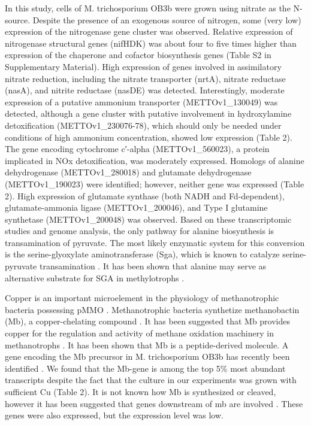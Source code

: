 In this study, cells of M. trichosporium OB3b were grown using nitrate as the N-source.
Despite the presence of an exogenous source of nitrogen, some (very low) expression of the nitrogenase gene cluster was observed.
Relative expression of nitrogenase structural genes (nifHDK) was about four to five times higher than expression of the chaperone and cofactor biosynthesis genes (Table S2 in Supplementary Material).
High expression of genes involved in assimilatory nitrate reduction, including the nitrate transporter (nrtA), nitrate reductase (nasA), and nitrite reductase (nasDE) was detected.
Interestingly, moderate expression of a putative ammonium transporter (METTOv1\_130049) was detected, although a gene cluster with putative involvement in hydroxylamine detoxification (METTOv1\_230076-78), which should only be needed under conditions of high ammonium concentration, showed low expression (Table 2).
The gene encoding cytochrome c′-alpha (METTOv1\_560023), a protein implicated in NOx detoxification, was moderately expressed.
Homologs of alanine dehydrogenase (METTOv1\_280018) and glutamate dehydrogenase (METTOv1\_190023) were identified; however, neither gene was expressed (Table 2).
High expression of glutamate synthase (both NADH and Fd-dependent), glutamate-ammonia ligase (METTOv1\_200046), and Type I glutamine synthetase (METTOv1\_200048) was observed.
Based on these transcriptomic studies and genome analysis, the only pathway for alanine biosynthesis is transamination of pyruvate.
The most likely enzymatic system for this conversion is the serine-glyoxylate aminotransferase (Sga), which is known to catalyze serine-pyruvate transamination \cite{liepman2001}.
It has been shown that alanine may serve as alternative substrate for SGA in methylotrophs \cite{karsten2001}.

Copper is an important microelement in the physiology of methanotrophic bacteria possessing pMMO \cite{anthony1982}.
Methanotrophic bacteria synthetize methanobactin (Mb), a copper-chelating compound \cite{kim2004, balasubramanian2008, semrau2010}.
It has been suggested that Mb provides copper for the regulation and activity of methane oxidation machinery in methanotrophs \cite{balasubramanian2010, semrau2010}.
It has been shown that Mb is a peptide-derived molecule.
A gene encoding the Mb precursor in M. trichosporium OB3b has recently been identified \cite{krentz2010}.
We found that the Mb-gene is among the top 5\% most abundant transcripts despite the fact that the culture in our experiments was grown with sufficient Cu (Table 2).
It is not known how Mb is synthesized or cleaved, however it has been suggested that genes downstream of mb are involved \cite{krentz2010}.
These genes were also expressed, but the expression level was low.

